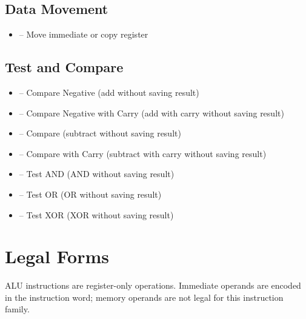 \subsection{Data Movement}
\begin{itemize}
	\item {} -- Move immediate or copy register
\end{itemize}

\subsection{Test and Compare}
\begin{itemize}
	\item {} -- Compare Negative (add without saving result)
	\item {} -- Compare Negative with Carry (add with carry without saving result)
	\item {} -- Compare (subtract without saving result)
	\item {} -- Compare with Carry (subtract with carry without saving result)
	\item {} -- Test AND (AND without saving result)
	\item {} -- Test OR (OR without saving result)
	\item {} -- Test XOR (XOR without saving result)
\end{itemize}

\section{Legal Forms}

ALU instructions are register-only operations. Immediate operands are encoded in the instruction word; memory operands
are not legal for this instruction family.

